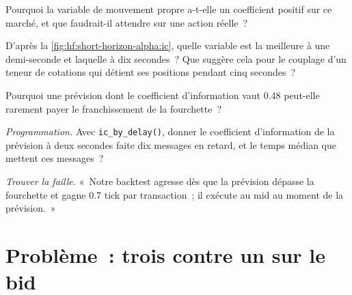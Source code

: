 \begin{exercise}[$\star\star$]\label{exo:hf:short-horizon-alpha:4}
Pourquoi la variable de mouvement propre a-t-elle un coefficient positif sur ce marché, et que faudrait-il attendre sur une action réelle~?
\end{exercise}

\begin{exercise}[$\star\star$]\label{exo:hf:short-horizon-alpha:5}
D'après la \cref{fig:hf:short-horizon-alpha:ic}, quelle variable est la meilleure à une demi-seconde et laquelle à dix secondes~? Que suggère cela pour le
couplage d'un teneur de cotations qui détient ses positions pendant cinq secondes~?
\end{exercise}

\begin{exercise}[$\star\star$]\label{exo:hf:short-horizon-alpha:6}
Pourquoi une prévision dont le coefficient d'information vaut 0.48 peut-elle rarement payer le franchissement de la fourchette~?
\end{exercise}

\begin{exercise}[$\star\star\star$]\label{exo:hf:short-horizon-alpha:7}
\emph{Programmation.} Avec \texttt{ic\_by\_delay()}, donner le coefficient d'information de la prévision à deux secondes faite dix messages en retard, et le temps médian
que mettent ces messages~?
\end{exercise}

\begin{exercise}[$\star\star\star$]\label{exo:hf:short-horizon-alpha:8}
\emph{Trouver la faille.} «~Notre backtest agresse dès que la prévision dépasse la fourchette et gagne 0.7 tick par transaction~; il exécute au mid au
moment de la prévision.~»
\end{exercise}

\section{Problème~: trois contre un sur le bid}

